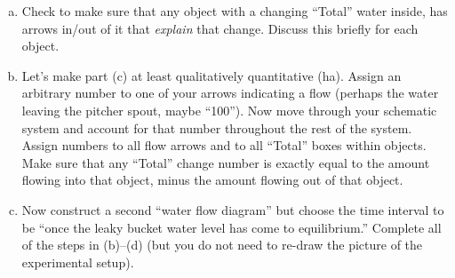 \documentclass[12pt]{article}
\begin{document}
\begin{enumerate}
\begin{enumerate}[(a)]
\begin{itemize}
		\item In each object box, give the name, and then indicate in the ``Total''  box whether the total water in that object is increasing/decreasing/neither during the chosen time interval (using up/down/horizontal arrows).
		\item Now draw an arrow {\em between any two boxes} for which there is a {\em flow} of water from one to the other.  It is possible that water flows out of an object to multiple other objects, or that an object receives water from multiple objects.
		\end{itemize}
	\item Check to make sure that any object with a changing ``Total'' water inside, has arrows in/out of it that {\em explain} that change.  Discuss this briefly for each object.
	\item Let's make part (c) at least qualitatively quantitative (ha).  Assign an arbitrary number to one of your arrows indicating a flow (perhaps the water leaving the pitcher spout, maybe ``100'').  Now move through your schematic system and account for that number throughout the rest of the system. Assign numbers to all flow arrows and to all ``Total'' boxes within objects. Make sure that any ``Total'' change number is exactly equal to the amount flowing into that object, minus the amount flowing out of that object.
	\item Now construct a second ``water flow diagram'' but choose the time interval to be ``once the leaky bucket water level has come to equilibrium.''  Complete all of the steps in (b)--(d) (but you do not need to re-draw the picture of the experimental setup).
	\end{enumerate}


\end{enumerate}
\end{document}
